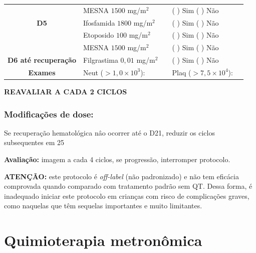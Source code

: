 \documentclass[11pt,a4paper,oldfontcommands]{memoir}
\begin{document}
\begin{center}
\begin{longtable}{p{1cm}p{4cm}|p{1cm}|p{3cm}|p{2.9cm}}
    \multicolumn{1}{c|}{\multirow{1}{*}{\textbf{}}}&{MESNA \(1500\) mg/m\(^2\)}&&{(  ) Sim (  ) Não}&\\
    \multicolumn{1}{c|}{\multirow{1}{*}{\textbf{D5}}}&{Ifosfamida \(1800\) mg/m\(^2\)}&&{(  ) Sim (  ) Não}&\\
    \multicolumn{1}{c|}{\multirow{1}{*}{\textbf{}}}&{Etoposido \(100\) mg/m\(^2\)}&&{(  ) Sim (  ) Não}&\\
    \multicolumn{1}{c|}{\multirow{1}{*}{\textbf{}}}&{MESNA \(1500\) mg/m\(^2\)}&&{(  ) Sim (  ) Não}&\\
    \multicolumn{1}{c|}{\multirow{1}{*}{\textbf{D6 até recuperação}}}&{Filgrastima \(0,01\) mg/m\(^2\)}&&{(  ) Sim (  ) Não}&\\

    \hline
    \multicolumn{1}{c|}{\multirow{1}{*}{\textbf{Exames}}}&\multicolumn{2}{l|}{Neut (\(>1,0\times10^3\)):}&{Plaq (\(>7,5\times10^4\)):}&{}\\
    \hline
\end{longtable}
\textbf{REAVALIAR A CADA 2 CICLOS}
\end{center}


\subsection{Modificações de dose:}
Se recuperação hematológica nâo ocorrer até o D21, reduzir os ciclos subsequentes em 25%

\textbf{Avaliação:} imagem a cada 4 ciclos, se progressão, interromper protocolo.

\textbf{ATENÇÃO:} este protocolo é \textit{off-label} (não padronizado) e não tem eficácia comprovada quando comparado com tratamento padrão sem QT. Dessa forma, é inadequado iniciar este protocolo em crianças com risco de complicações graves, como naquelas que têm sequelas importantes e muito limitantes.\\

\cleardoublepage
\chapter{Quimioterapia metronômica}
\cleardoublepage
\end{document}
